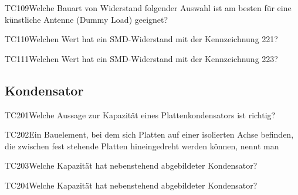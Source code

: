 \begin{question}{TC109}{Welche Bauart von Widerstand folgender Auswahl ist am besten für eine künstliche Antenne (Dummy Load) geeignet?}
\end{question}

\begin{question}{TC110}{Welchen Wert hat ein SMD-Widerstand mit der Kennzeichnung 221?}
\end{question}

\begin{question}{TC111}{Welchen Wert hat ein SMD-Widerstand mit der Kennzeichnung 223?}
\end{question}

\subsection{Kondensator}

\begin{question}{TC201}{Welche Aussage zur Kapazität eines Plattenkondensators ist richtig?}
\end{question}

\begin{question}{TC202}{Ein Bauelement, bei dem sich Platten auf einer isolierten Achse befinden, die zwischen fest stehende Platten hineingedreht werden können, nennt man}
\end{question}

\begin{question}{TC203}{Welche Kapazität hat nebenstehend abgebildeter Kondensator?}
\end{question}

\begin{question}{TC204}{Welche Kapazität hat nebenstehend abgebildeter Kondensator?}
\end{question}

